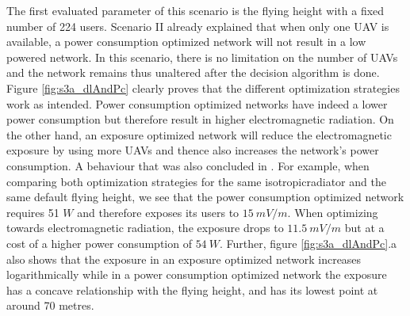 The first evaluated parameter of this scenario is the flying height
with a fixed number of 224 users.
Scenario II already explained that when only one \gls{UAV} is available, a power consumption optimized network will not result in a low 
powered network. In this scenario, there is no limitation on the number of \gls{UAV}s and the network remains thus unaltered after the decision 
algorithm is done. Figure \ref{fig:s3a_dlAndPc} clearly proves that the different optimization strategies work as intended.
Power consumption optimized networks have indeed a lower power consumption but therefore result in higher electromagnetic radiation.
On the other hand, an exposure optimized network will reduce the electromagnetic exposure by using more \gls{UAV}s and thence also increases the network's power consumption.
A behaviour that was also concluded in \cite{J1}.
For example, when comparing both optimization strategies for the same \gls{isotropicradiator} and the same default flying height, we see that
the power consumption optimized network requires 51 $W$ and therefore exposes its users
to $15\ mV/m$. When optimizing towards electromagnetic radiation, the exposure drops to $11.5\ mV/m$ but at a cost of a higher power consumption
of $54\ W$.
Further, figure  \ref{fig:s3a_dlAndPc}.a also shows that the exposure in an exposure optimized network increases logarithmically while in a power consumption optimized network the exposure has a concave relationship with the flying height, and has its lowest point at around 70 metres.


